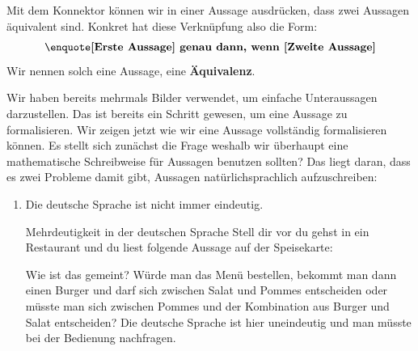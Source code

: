 \documentclass[../../main.tex]{subfiles}
\begin{document}
Mit dem Konnektor  
 können wir in einer Aussage ausdrücken, dass zwei Aussagen äquivalent sind. Konkret hat 
 diese Verknüpfung also die Form: 
 \[\statement{[Erste Aussage] genau dann, wenn 
 [Zweite Aussage]}\]
  Wir nennen solch eine Aussage, eine \textbf{Äquivalenz}.

Wir haben bereits mehrmals Bilder verwendet, um einfache Unteraussagen darzustellen. Das ist bereits ein Schritt gewesen, um eine Aussage zu formalisieren. Wir zeigen jetzt wie wir eine Aussage vollständig formalisieren können. Es stellt sich zunächst die Frage weshalb wir überhaupt eine mathematische Schreibweise für Aussagen benutzen sollten? Das liegt daran, dass es zwei Probleme damit gibt, Aussagen natürlichsprachlich aufzuschreiben:

\begin{enumerate}
    \item Die deutsche Sprache ist nicht immer eindeutig. 
        \begin{example}{Mehrdeutigkeit in der deutschen Sprache}
        Stell dir vor du gehst in ein Restaurant und du liest folgende Aussage auf der
        Speisekarte: 
        
         
         Wie ist das gemeint? Würde man das Menü bestellen, bekommt man dann einen Burger und darf sich zwischen Salat und Pommes entscheiden oder müsste man sich zwischen Pommes und der Kombination aus Burger und Salat entscheiden? Die deutsche Sprache ist hier uneindeutig und man müsste bei der Bedienung nachfragen.
         

\end{example}
\end{enumerate}
\end{document}
